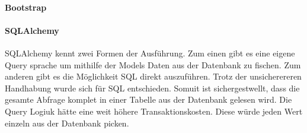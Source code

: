 \documentclass[a4paper,10pt]{article}
\begin{document}
\paragraph{Bootstrap}

\paragraph{SQLAlchemy}\label{par:anforderungen-SQLAlchemy}

SQLAlchemy kennt zwei Formen der Ausführung. Zum einen gibt es eine eigene Query sprache um mithilfe der Models Daten aus der Datenbank zu fischen. Zum  anderen gibt es die Möglichkeit SQL direkt auszuführen. Trotz der unsicherereren Handhabung wurde sich für SQL entschieden.  Somuit ist sichergestwellt, dass die gesamte Abfrage komplet in einer Tabelle aus der Datenbank gelesen wird. Die Query Logiuk hätte eine weit höhere Transaktionskosten. Diese würde jeden Wert einzeln aus der Datenbank picken.  %
\end{document}
